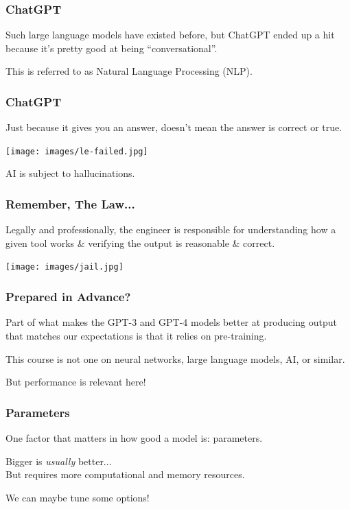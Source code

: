 \begin{frame}
\frametitle{ChatGPT}

Such large language models have existed before, but ChatGPT ended up a hit because it's pretty good at being ``conversational''.

This is referred to as Natural Language Processing (NLP).

\end{frame}

\begin{frame}
\frametitle{ChatGPT}

Just because it gives you an answer, doesn't mean the answer is correct or true.

\begin{center}
	\texttt{[image: images/le-failed.jpg]}
\end{center}

AI is subject to \alert{hallucinations}.

\end{frame}

\begin{frame}
\frametitle{Remember, The Law...}
Legally and professionally, the engineer is responsible for understanding how a given tool works \& verifying the output is reasonable \& correct.

\begin{center}
	\texttt{[image: images/jail.jpg]}
\end{center}

\end{frame}

\begin{frame}
\frametitle{Prepared in Advance?}
Part of what makes the GPT-3 and GPT-4 models better at producing output that matches our expectations is that it relies on pre-training.

This course is not one on neural networks, large language models, AI, or similar.

But performance is relevant here!

\end{frame}

\begin{frame}
\frametitle{Parameters}

One factor that matters in how good a model is: parameters.

Bigger is \textit{usually} better...\\
\quad But requires more computational and memory resources.

We can maybe tune some options!

\end{frame}

